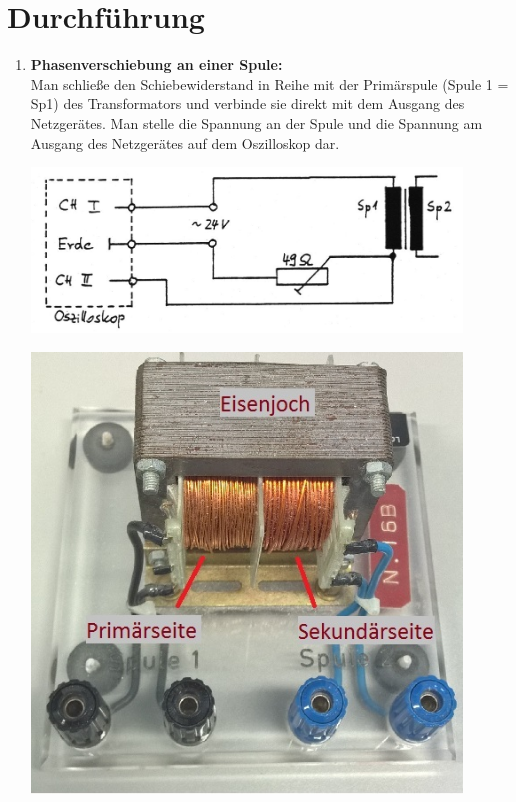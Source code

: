 \section{Durchführung} 

\begin{enumerate}
	\item \label{VT1}
		\textbf{Phasenverschiebung an einer Spule:}\\
		Man schließe den Schiebewiderstand in Reihe mit der Primärspule (Spule 1 = Sp1) des Transformators und verbinde sie direkt mit dem Ausgang des Netzgerätes. Man stelle die Spannung an der Spule und die Spannung am Ausgang des 
		Netzgerätes auf dem Oszilloskop dar.\\
		
		\begin{minipage}{0.7\textwidth}
			\centering
				\includegraphics[width=0.90\textwidth]{Abbildungen/Bild31.jpg}
			\label{fig:Bild31}
		\end{minipage}
		\begin{minipage}{0.3\textwidth}
			\centering
				\includegraphics[width=0.90\textwidth]{Abbildungen/Trafo.jpg}
			\label{fig:Trafo_Foto}
		\end{minipage}
		

\end{enumerate}
